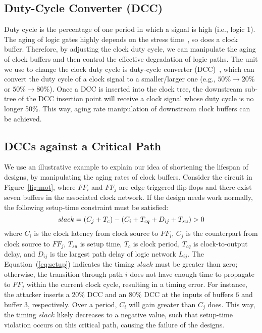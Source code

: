 \subsection{Duty-Cycle Converter (DCC)}
Duty cycle is the percentage of one period in which a signal is high (i.e., logic 1). The aging of logic gates highly depends on the stress time~\cite{wang2010impact}, so does a clock buffer. %
Therefore, by adjusting the clock duty cycle, we can manipulate the aging of clock buffers and then control the effective degradation of logic paths. The unit we use to change the clock duty cycle is duty-cycle converter (DCC)~\cite{wu2018maui}, which can convert the duty cycle of a clock signal to a smaller/larger one (e.g., $50\% \rightarrow 20\%$ or $50\% \rightarrow 80\%$). Once a DCC is inserted into the clock tree, the downstream sub-tree of the DCC insertion point will receive a clock signal whose duty cycle is no longer 50\%. This way, aging rate manipulation of downstream clock buffers can be achieved.
\subsection{DCCs against a Critical Path}
We use an illustrative example to explain our idea of shortening the lifespan of designs, by manipulating the aging rates of clock buffers. Consider the circuit in Figure~\ref{fig:mot}, where $FF_{i}$ and $FF_{j}$ are edge-triggered flip-flops and there exist seven buffers in the associated clock network. If the design needs work normally, the following setup-time constraint must be satisfied:
\begin{equation}
	\label{eq:setup}
	\fontsize{8}{9} \selectfont
	slack = (C_{j} + T_{c}) - (C_{i}  + T_{cq} + D_{ij} + T_{su}) > 0 
\end{equation}
where $C_{i}$ is the clock latency from clock source to $FF_{i}$, $C_{j}$ is the counterpart from clock source to $FF_{j}$, $T_{su}$ is setup time, $T_{c}$ is clock period, $T_{cq}$ is clock-to-output delay, and $D_{ij}$ is the largest path delay of logic network $L_{ij}$. The Equation~(\ref{eq:setup}) indicates the timing $slack$ must be greater than zero; otherwise, the transition through path $i$ does not have enough time to propagate to $FF_{j}$ within the current clock cycle, resulting in a timing error. For instance, the attacker inserts a 20\% DCC and an 80\% DCC at the inputs of buffers 6 and buffer 3, respectively. Over a period, $C_{i}$ will gain greater than $C_{j}$ does. This way, the timing $slack$ likely decreases to a negative value, such that setup-time violation occurs on this critical path, causing the failure of the designs.